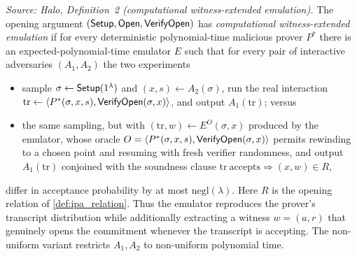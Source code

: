 \begin{definition}
  \label{def:wee}
  \textit{Source: Halo, Definition~2 (computational witness-extended emulation).}
  The opening argument \((\mathsf{Setup}, \mathsf{Open}, \mathsf{VerifyOpen})\) has \emph{computational
  witness-extended emulation} if for every deterministic polynomial-time malicious
  prover \(P^{*}\) there is an expected-polynomial-time emulator \(E\) such that for
  every pair of interactive adversaries \((A_{1}, A_{2})\) the two experiments
  \begin{itemize}
    \item sample \(\sigma \leftarrow \mathsf{Setup}(1^{\lambda})\) and \((x, s) \leftarrow
      A_{2}(\sigma)\), run the real interaction \(\mathrm{tr} \leftarrow
      \langle P^{*}(\sigma, x, s), \mathsf{VerifyOpen}(\sigma, x)\rangle\), and output
      \(A_{1}(\mathrm{tr})\); versus
    \item the same sampling, but with \((\mathrm{tr}, w) \leftarrow E^{O}(\sigma, x)\)
      produced by the emulator, whose oracle
      \(O = \langle P^{*}(\sigma, x, s), \mathsf{VerifyOpen}(\sigma, x)\rangle\) permits
      rewinding to a chosen point and resuming with fresh verifier randomness, and
      output \(A_{1}(\mathrm{tr})\) conjoined with the soundness clause
      \(\mathrm{tr}\ \text{accepts} \Rightarrow (x, w) \in R\),
  \end{itemize}
  differ in acceptance probability by at most \(\mathrm{negl}(\lambda)\). Here
  \(R\) is the opening relation of \cref{def:ipa_relation}. Thus the emulator
  reproduces the prover's transcript distribution while additionally extracting a
  witness \(w = (a, r)\) that genuinely opens the commitment whenever the
  transcript is accepting. The non-uniform variant restricts \(A_{1}, A_{2}\) to
  non-uniform polynomial time.
\end{definition}

